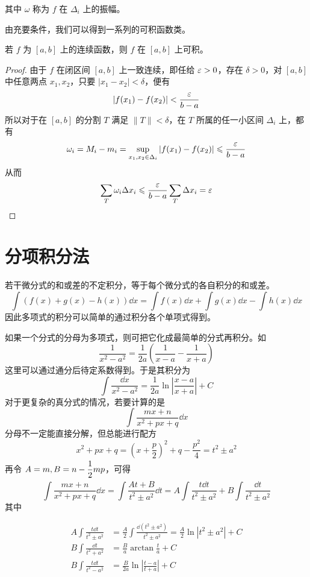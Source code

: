其中 $\omega$ 称为 $f$ 在 $\Delta_i$ 上的振幅。

由充要条件，我们可以得到一系列的可积函数类。

\begin{theorem}
    若 $f$ 为 $[a,b]$ 上的连续函数，则 $f$ 在 $[a,b]$ 上可积。
\end{theorem}
\begin{proof}
    由于 $f$ 在闭区间 $[a,b]$ 上一致连续，即任给 $\varepsilon > 0$，存在 $\delta>0$，对 $[a,b]$ 中任意两点 $x_1,x_2$，只要 $|x_1-x_2|<\delta$，便有
    $$|f(x_1)-f(x_2)| < \frac{\varepsilon}{b-a}$$
    所以对于在 $[a,b]$ 的分割 $T$ 满足 $\|T\| < \delta$，在 $T$ 所属的任一小区间 $\Delta_i$ 上，都有
    $$\omega_i = M_i-m_i = \sup_{x_1,x_2\in\Delta_i}|f(x_1)-f(x_2)| \leqslant \frac{\varepsilon}{b-a}$$
    从而
    $$\sum_{T}\omega_i\Delta x_i \leqslant \frac{\varepsilon}{b-a}\sum_T\Delta x_i = \varepsilon$$
\end{proof}



\section{分项积分法}

若干微分式的和或差的不定积分，等于每个微分式的各自积分的和或差。
$$\int\left( f(x)+g(x)-h(x) \right)\dd x = \int f(x)\dd x + \int g(x)\dd x - \int h(x)\dd x$$
因此多项式的积分可以简单的通过积分各个单项式得到。

如果一个分式的分母为多项式，则可把它化成最简单的分式再积分。如
$$\frac{1}{x^2-a^2} = \frac{1}{2a}\left( \frac{1}{x-a}-\frac{1}{x+a} \right)$$
这里可以通过通分后待定系数得到。于是其积分为
$$\int \frac{\dd x}{x^2-a^2} = \frac{1}{2a}\ln\left|\frac{x-a}{x+a}\right|+C$$
对于更复杂的真分式的情况，若要计算的是
$$\int \frac{mx+n}{x^2+px+q} \dd x$$
分母不一定能直接分解，但总能进行配方
$$x^2+px+q = \left(x+\frac{p}{2}\right)^2+q-\frac{p^2}{4} = t^2 \pm a^2$$
再令 $A=m,B=n-\mfrac12mp$，可得
$$\int \frac{mx+n}{x^2+px+q} \dd x = \int \frac{At+B}{t^2 \pm a^2} \dd t 
= A\int \frac{t\dd t}{t^2 \pm a^2} + B\int \frac{\dd t}{t^2 \pm a^2}$$
其中

\begin{equation*}
    \begin{aligned}
        A\int \frac{t \dd t}{t^2 \pm a^2} &= \frac{A}{2}\int \frac{\dd(t^2 \pm a^2)}{t^2 \pm a^2} = \frac{A}{2} \ln|t^2 \pm a^2| +C \\
        B\int \frac{\dd t}{t^2 + a^2} &= \frac{B}{a}\arctan\frac{t}{a}+C \\
        B\int \frac{t \dd t}{t^2 - a^2} &= \frac{B}{2a}\ln\left|\frac{t-a}{t+a}\right|+C
    \end{aligned}
\end{equation*}

